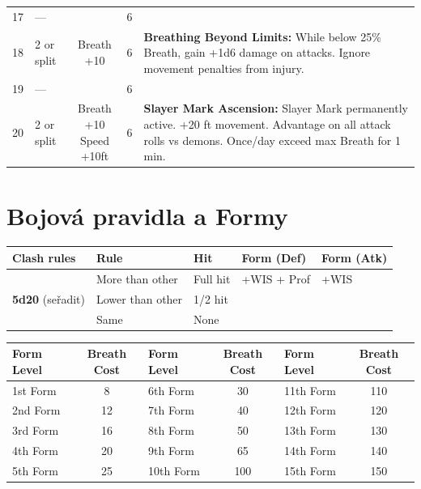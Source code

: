 \documentclass[a4paper, 10pt]{article}
\begin{document}
\begin{tabularx}{\textwidth}{c l c c X}
17 & — & & 6 & \\
18 & 2 or split & Breath +10 & 6 & \textbf{Breathing Beyond Limits:} While below 25\% Breath, gain +1d6 damage on attacks. Ignore movement penalties from injury. \\
19 & — & & 6 & \\
20 & 2 or split & \makecell{Breath +10 \\ Speed +10ft} & 6 & \textbf{Slayer Mark Ascension:} Slayer Mark permanently active. +20 ft movement. Advantage on all attack rolls vs demons. Once/day exceed max Breath for 1 min. \\
\bottomrule
\end{tabularx}

\vspace{1em}

\section*{Bojová pravidla a Formy}

\begin{table}[h!]
\centering
\begin{tabular}{lllll}
\toprule
\textbf{Clash rules} & \textbf{Rule} & \textbf{Hit} & \textbf{Form (Def)} & \textbf{Form (Atk)} \\
\midrule
\multirow{3}{*}{\textbf{5d20} (seřadit)} & More than other & Full hit & +WIS + Prof & +WIS \\
 & Lower than other & 1/2 hit & & \\
 & Same & None & & \\
\bottomrule
\end{tabular}
\end{table}

\begin{table}[h!]
\centering
\begin{tabular}{lc | lc | lc}
\toprule
\textbf{Form Level} & \textbf{Breath Cost} & \textbf{Form Level} & \textbf{Breath Cost} & \textbf{Form Level} & \textbf{Breath Cost} \\
\midrule
1st Form & 8  & 6th Form & 30  & 11th Form & 110 \\
2nd Form & 12 & 7th Form & 40  & 12th Form & 120 \\
3rd Form & 16 & 8th Form & 50  & 13th Form & 130 \\
4th Form & 20 & 9th Form & 65  & 14th Form & 140 \\
5th Form & 25 & 10th Form & 100 & 15th Form & 150 \\
\bottomrule
\end{tabular}
\end{table}
\end{document}
